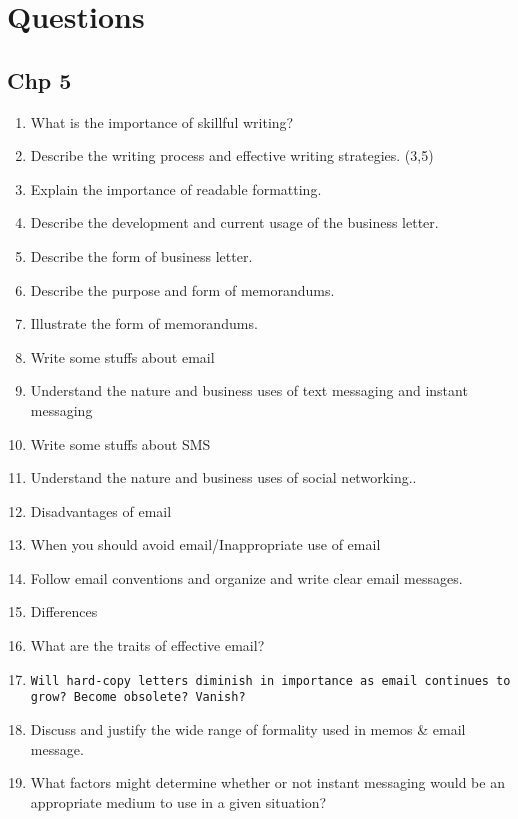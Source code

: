 \documentclass[11pt]{article}
\author{Abhijit Paul}
\date{\today}
\title{}
\begin{document}
\tableofcontents

\section{Questions}
\label{sec:orgfb201d0}
\subsection{Chp 5}
\label{sec:orgbc82946}
\begin{enumerate}
\item What is the importance of skillful writing?
\item Describe the writing process and effective writing strategies. (3,5)
\item Explain the importance of readable formatting.
\item Describe the development and current usage of the business letter.
\item Describe the form of business letter.
\item Describe the purpose and form of memorandums.
\item Illustrate the form of memorandums.
\item Write some stuffs about email
\item Understand the nature and business uses of text messaging and instant messaging
\item Write some stuffs about SMS
\item Understand the nature and business uses of social networking..
\item Disadvantages of email
\item When you should avoid email/Inappropriate use of email
\item Follow email conventions and organize and write clear email messages.
\item Differences
\item What are the traits of effective email?
\item \texttt{Will hard-copy letters diminish in importance as email continues to grow? Become obsolete? Vanish?}
\item Discuss and justify the wide range of formality used in memos \& email message.
\item What factors might determine whether or not instant messaging would be an appropriate medium to use in a given situation?
\end{enumerate}
\end{document}
